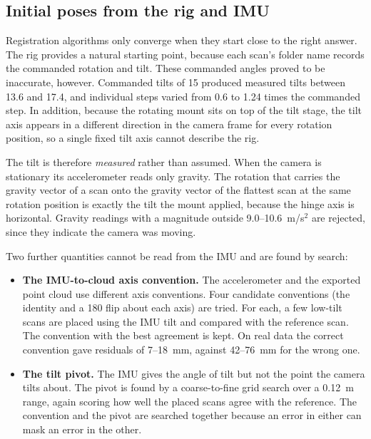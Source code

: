 \subsection{Initial poses from the rig and IMU}
\label{sec:initial_pose}

Registration algorithms only converge when they start close to the right answer. The rig provides a natural starting point, because each scan's folder name records the commanded rotation and tilt. These commanded angles proved to be inaccurate, however. Commanded tilts of 15\degree{} produced measured tilts between 13.6\degree{} and 17.4\degree{}, and individual steps varied from 0.6 to 1.24 times the commanded step. In addition, because the rotating mount sits on top of the tilt stage, the tilt axis appears in a different direction in the camera frame for every rotation position, so a single fixed tilt axis cannot describe the rig.

The tilt is therefore \emph{measured} rather than assumed. When the camera is stationary its accelerometer reads only gravity. The rotation that carries the gravity vector of a scan onto the gravity vector of the flattest scan at the same rotation position is exactly the tilt the mount applied, because the hinge axis is horizontal. Gravity readings with a magnitude outside 9.0--10.6~m/s$^2$ are rejected, since they indicate the camera was moving.

Two further quantities cannot be read from the IMU and are found by search:

\begin{itemize}
	\item \textbf{The IMU-to-cloud axis convention.} The accelerometer and the exported point cloud use different axis conventions. Four candidate conventions (the identity and a 180\degree{} flip about each axis) are tried. For each, a few low-tilt scans are placed using the IMU tilt and compared with the reference scan. The convention with the best agreement is kept. On real data the correct convention gave residuals of 7--18~mm, against 42--76~mm for the wrong one.
	
	\item \textbf{The tilt pivot.} The IMU gives the angle of tilt but not the point the camera tilts about. The pivot is found by a coarse-to-fine grid search over a 0.12~m range, again scoring how well the placed scans agree with the reference. The convention and the pivot are searched together because an error in either can mask an error in the other.
\end{itemize}

